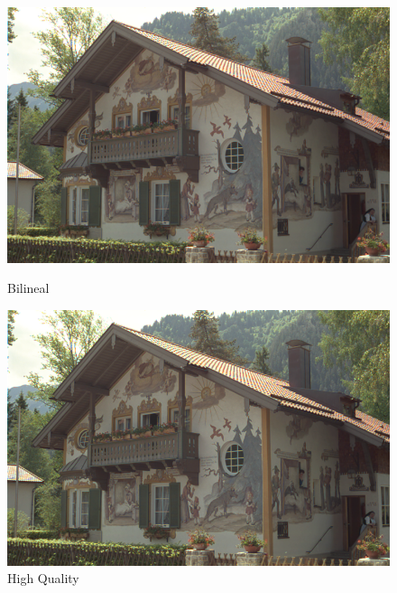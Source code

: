 {\begin{figure}[!ht]
\begin{center}
    \includegraphics[scale=0.3]{imagenes/img12_demosicing_bilineal.png}
    \caption{Bilineal }
 \end{center}
\endminipage
{}
\begin{center}
    \includegraphics[scale=0.3]{imagenes/img12_demosicing_quality.png}
    \caption{High Quality}
        \end{center}
\endminipage\hfill
\end{figure}

}
